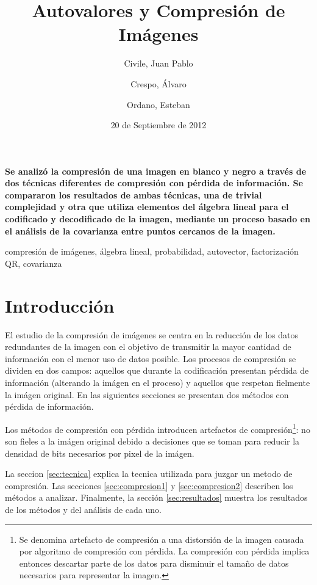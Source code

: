 \documentclass[twocolumn,a4paper,10pt]{article}
\title{Autovalores y Compresión de Imágenes}
\date{20 de Septiembre de 2012}
\author{Civile, Juan Pablo \and Crespo, Álvaro \and Ordano, Esteban }
\begin{document}
\pagestyle{fancy}
\maketitle
\thispagestyle{fancy}

\begin{customabstract}
\textbf{
    Se analizó la compresión de una imagen en blanco y negro a través de dos técnicas diferentes de compresión con pérdida de información.
    Se compararon los resultados de ambas técnicas, una de trivial complejidad y otra que utiliza elementos del álgebra lineal para el codificado
    y decodificado de la imagen, mediante un proceso basado en el análisis de la covarianza entre puntos cercanos de la imagen.
}
\end{customabstract}

\begin{keywords}
compresi\'on de im\'agenes, \'algebra lineal, probabilidad, autovector, factorizaci\'on QR, covarianza
\end{keywords}


\section{Introducci\'on}

El estudio de la compresi\'on de im\'agenes se centra en la reducci\'on de los datos redundantes de la imagen con el objetivo de transmitir la mayor cantidad de información con el menor uso de datos posible. Los procesos de compresi\'on se dividen en dos campos: aquellos que durante la codificación presentan p\'erdida de información (alterando la imágen en el proceso) y aquellos que respetan fielmente la imágen original. 
En las siguientes secciones se presentan dos métodos con pérdida de información. 

Los métodos de compresión con p\'erdida introducen artefactos de compresión\footnote{Se denomina artefacto de compresi\'on a una distorsión de la imagen causada por algoritmo de compresi\'on con p\'erdida. La compresi\'on con p\'erdida implica entonces descartar parte de los datos para disminuir el tamaño de datos necesarios para representar la imagen.}: no son fieles a la imágen original debido a decisiones que se toman para reducir la densidad de bits necesarios por pixel de la imágen.

La seccion \ref{sec:tecnica} explica la tecnica utilizada para juzgar un metodo de compresión. Las secciones \ref{sec:compresion1} y \ref{sec:compresion2} describen los métodos a analizar. Finalmente, la sección \ref{sec:resultados} muestra los resultados de los métodos y del análisis de cada uno.
\end{document}
